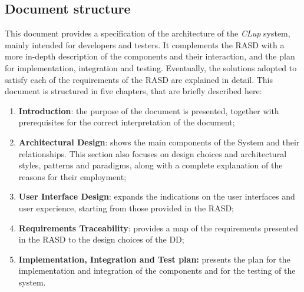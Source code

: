 \subsection{Document structure}
This document provides a specification of the architecture of the \emph{CLup} system, mainly intended for developers and testers. 
It complements the RASD with a more in-depth description of the components and their interaction, and the plan for implementation, integration and testing. 
Eventually, the solutions adopted to satisfy each of the requirements of the RASD are explained in detail.
This document is structured in five chapters, that are briefly described here:
\begin{enumerate}
\item\textbf{Introduction}: the purpose of the document is presented, together with prerequisites for the correct interpretation of the document;
\item\textbf{Architectural Design}: shows the main components of the System and their relationships. This section also focuses on design choices and architectural styles, patterns and paradigms, along with a complete explanation of the reasons for their employment;
\item\textbf{User Interface Design}: expands the indications on the user interfaces and user experience, starting from those provided in the RASD;
\item\textbf{Requirements Traceability}: provides a map of the requirements presented in the RASD to the design choices of the DD;
\item\textbf{Implementation, Integration and Test plan:} presents the plan for the implementation and integration of the components and for the testing of the system.
\end{enumerate}

